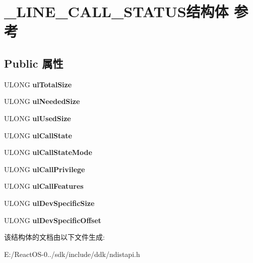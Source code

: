 \hypertarget{struct___l_i_n_e___c_a_l_l___s_t_a_t_u_s}{}\section{\+\_\+\+L\+I\+N\+E\+\_\+\+C\+A\+L\+L\+\_\+\+S\+T\+A\+T\+U\+S结构体 参考}
\label{struct___l_i_n_e___c_a_l_l___s_t_a_t_u_s}
\subsection*{Public 属性}
\begin{DoxyCompactItemize}
\item 
\mbox{\label{struct___l_i_n_e___c_a_l_l___s_t_a_t_u_s_ab26c039fe58ee74b16d61eb36551b334}} 
U\+L\+O\+NG {\bfseries ul\+Total\+Size}
\item 
\mbox{\label{struct___l_i_n_e___c_a_l_l___s_t_a_t_u_s_ab5230c9641d5cd1b1761bf07f483da33}} 
U\+L\+O\+NG {\bfseries ul\+Needed\+Size}
\item 
\mbox{\label{struct___l_i_n_e___c_a_l_l___s_t_a_t_u_s_a0bdd65451f0be90b73347d51d7e08d04}} 
U\+L\+O\+NG {\bfseries ul\+Used\+Size}
\item 
\mbox{\label{struct___l_i_n_e___c_a_l_l___s_t_a_t_u_s_a3a0fba2cab254e0cea0e08ec40bd63ed}} 
U\+L\+O\+NG {\bfseries ul\+Call\+State}
\item 
\mbox{\label{struct___l_i_n_e___c_a_l_l___s_t_a_t_u_s_a0670b8f920d7af9891a96a17826455e5}} 
U\+L\+O\+NG {\bfseries ul\+Call\+State\+Mode}
\item 
\mbox{\label{struct___l_i_n_e___c_a_l_l___s_t_a_t_u_s_a0b0c9674e556532f2318a96209437019}} 
U\+L\+O\+NG {\bfseries ul\+Call\+Privilege}
\item 
\mbox{\label{struct___l_i_n_e___c_a_l_l___s_t_a_t_u_s_a76283073b936133aa95f910a968837ff}} 
U\+L\+O\+NG {\bfseries ul\+Call\+Features}
\item 
\mbox{\label{struct___l_i_n_e___c_a_l_l___s_t_a_t_u_s_ab2ae7cf90b60a9b43ee62c1b567deb46}} 
U\+L\+O\+NG {\bfseries ul\+Dev\+Specific\+Size}
\item 
\mbox{\label{struct___l_i_n_e___c_a_l_l___s_t_a_t_u_s_a9bbae9f642edd18fabbfcc8eeef3b92f}} 
U\+L\+O\+NG {\bfseries ul\+Dev\+Specific\+Offset}
\end{DoxyCompactItemize}


该结构体的文档由以下文件生成\+:\begin{DoxyCompactItemize}
\item 
E\+:/\+React\+O\+S-\/0../sdk/include/ddk/ndistapi.\+h\end{DoxyCompactItemize}
